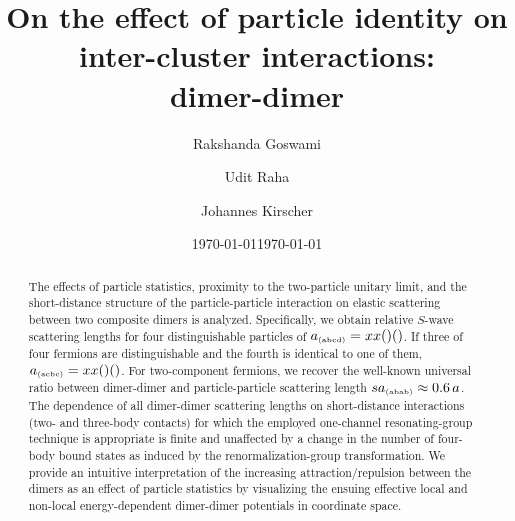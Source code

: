 \documentclass[preprint,aps,onecolumn,preprintnumbers,amsmath,amssymb,nofootinbib,superscriptaddress]{revtex4-1}
\newcommand{\abcd}{\ensuremath{a_\text{\tiny (abcd)}}}
\newcommand{\abcc}{\ensuremath{a_\text{\tiny (acbc)}}}
\newcommand{\add}{\ensuremath{a_\text{\tiny (abab)}}}
\begin{document}
\title{On the effect of particle identity on inter-cluster interactions:\\
dimer-dimer}

\author{Rakshanda Goswami}
\author{Udit Raha}
\address{Department of Physics, Indian Institute of Technology Guwahati, Guwahati 781039, India}
\author{Johannes Kirscher}
\address{Department of Physics, SRM University - AP, Amaravati 522502, Andhra Pradesh, India}
\date{\today}

\date{\today}

\begin{abstract}
The effects of particle statistics, proximity to the two-particle unitary limit,
and the short-distance structure of the particle-particle interaction on
elastic scattering between two composite dimers is analyzed. Specifically, we
obtain relative $S$-wave scattering lengths for four distinguishable particles of $\abcd=xx()()$.
If three of four fermions are distinguishable and the fourth is identical to one of them,
$\abcc=xx()()$. For two-component fermions, we recover the well-known universal ratio between
dimer-dimer and particle-particle scattering length
$s\add\approx0.6\,a$.
The dependence of all dimer-dimer scattering lengths on short-distance interactions (two- and three-body contacts)
for which the employed one-channel resonating-group technique is appropriate is finite and unaffected by a
change in the number of four-body bound states as induced by the renormalization-group transformation.
We provide an intuitive interpretation of the increasing attraction/repulsion between the dimers as an
effect of particle statistics by visualizing the ensuing effective local and non-local energy-dependent
dimer-dimer potentials in coordinate space.
\end{abstract}

\maketitle
\end{document}
